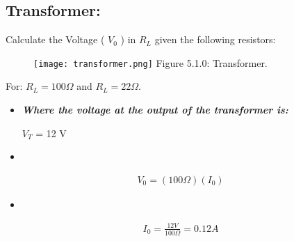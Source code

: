 \subsection{Transformer:}

Calculate the Voltage ( $V_{0}$ ) in $R_{L}$ given the following resistors:

\begin{figure}[H]
\texttt{[image: transformer.png]}
\centering \linebreak \linebreak Figure 5.1.0: Transformer.
\end{figure}

For: $R_{L} = 100\Omega$ and $R_{L} = 22\Omega$.

\begin{itemize}
\item {\bfseries\itshape Where the voltage at the output of the transformer is:
\begin{tasks}
\task $V_{T}$ = 12 V
\end{tasks}} \hfill
\end{itemize}

{\bfseries\itshape\color{Maroon}{Solution:}} \hfill \break

\begin{itemize}
\item {\bfseries\itshape{}} \hfill \break
{\bfseries\itshape\color{Brown}{
\begin{tasks}
\task Using Ohm's Law: $V$ = $(\ I\ )(\ R\ )$. \hfill \break
\end{tasks}}}

\end{itemize}

\begin{ceqn}
\begin{align}
V_{0} = ( 100\Omega )( I_{0} )
\end{align}
\end{ceqn} \hfill

\begin{itemize}
\item {\bfseries\itshape{}} \hfill \break
\end{itemize}

\begin{ceqn}
\begin{align}
I_{0} = \frac{12V}{100\Omega} = 0.12 A
\end{align}
\end{ceqn} \hfill

